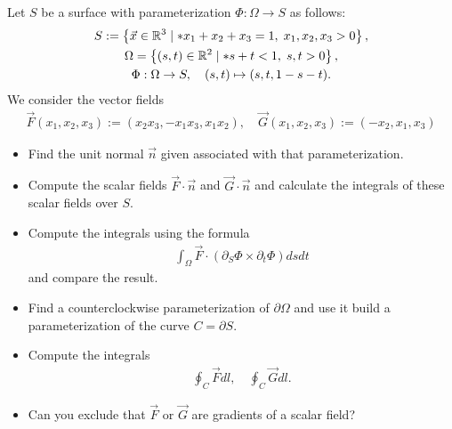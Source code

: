 \documentclass[11pt]{article}
\begin{document}
\begin{exercise} %
    Let $S$ be a surface with parameterization $\Phi : \Omega \to S$ as follows:
    \begin{gather*}
     S := \left\{ \vec x \in \bbR^3 \suchthat* x_1 + x_2 + x_3 = 1, \; x_1, x_2, x_3 > 0 \right\},
     \\
     \Omega = \left\{ (s,t) \in \bbR^2 \suchthat* s + t < 1, \; s, t > 0 \right\},
     \\ 
     \Phi : \Omega \to S, \quad (s,t) \mapsto (s,t,1-s-t).
    \end{gather*}
    We consider the vector fields 
    \begin{align*}
        \vec F(x_1,x_2,x_3) := (x_2 x_3, -x_1 x_3, x_1 x_2), \quad \vec G(x_1,x_2,x_3) := (-x_2, x_1,x_3)
    \end{align*}
    \begin{itemize}
    \item
     Find the unit normal $\vec n$ given associated with that parameterization.
    \item
     Compute the scalar fields $\vec F \cdot \vec n$ and $\vec G \cdot \vec n$ and calculate the integrals of these scalar fields over $S$.
    \item
     Compute the integrals using the formula 
     \begin{align*}
        \int_\Omega \vec F \cdot ( \partial_S \Phi \times \partial_t \Phi ) dsdt
     \end{align*}
     and compare the result. 
    \item 
     Find a counterclockwise parameterization of $\partial\Omega$ and use it build a parameterization of the curve $C = \partial S$.
    \item 
     Compute the integrals 
     \begin{align*}
        \oint_C \vec F dl, \quad \oint_C \vec G dl.
     \end{align*}
    \item 
     Can you exclude that $\vec F$ or $\vec G$ are gradients of a scalar field?
    \end{itemize}
\end{exercise}
\end{document}
